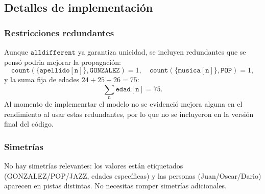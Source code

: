 
\subsection{Detalles de implementación}\label{sec:04-acertijo-logico-impl}
\subsubsection*{Restricciones redundantes}
Aunque $\texttt{alldifferent}$ ya garantiza unicidad, se incluyen redundantes que se pensó podria mejorar la propagación:
\[
\texttt{count}(\{\texttt{apellido}[\texttt{n}]\},\texttt{GONZALEZ})=1,\quad
\texttt{count}(\{\texttt{musica}[\texttt{n}]\},\texttt{POP})=1,
\]
y la suma fija de edades $24+25+26=75$:
\[
\sum_{\texttt{n}} \texttt{edad}[\texttt{n}] = 75.
\]
Al momento de implemenrtar el modelo no se evidenció mejora alguna en el rendimiento al usar estas redundantes, por lo que no se incluyeron en la versión final del código.

\subsubsection*{Simetrías}
No hay simetrías relevantes: los valores están etiquetados (GONZALEZ/POP/JAZZ, edades específicas) y las personas (Juan/Oscar/Dario) aparecen en pistas distintas. No necesitas romper simetrías adicionales.
